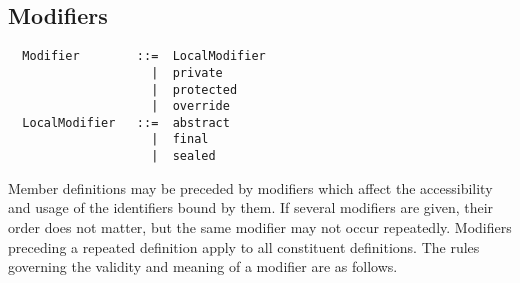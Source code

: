 \documentclass[a4paper,12pt,twoside,titlepage]{book}
\newcommand{\ifqualified}[1]{}
\begin{document}
\subsection{Modifiers}
\label{sec:modifiers}

\syntax\begin{lstlisting}
  Modifier        ::=  LocalModifier
                    |  private
                    |  protected
                    |  override 
  LocalModifier   ::=  abstract
                    |  final
                    |  sealed
\end{lstlisting}

Member definitions may be preceded by modifiers which affect the
\ifqualified{qualified names, }accessibility and usage of the
identifiers bound by them.  If several modifiers are given, their
order does not matter, but the same modifier may not occur repeatedly.
Modifiers preceding a repeated definition apply to all constituent
definitions.  The rules governing the validity and meaning of a
modifier are as follows.
\end{document}
